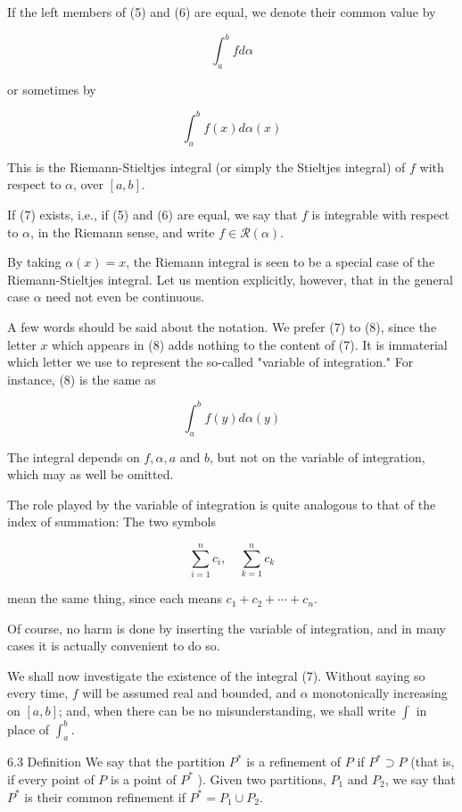 \documentclass[10pt]{article}
\begin{document}
If the left members of (5) and (6) are equal, we denote their common value by

$$
\int_{a}^{b} f d \alpha
$$

or sometimes by

$$
\int_{a}^{b} f(x) d \alpha(x)
$$

This is the Riemann-Stieltjes integral (or simply the Stieltjes integral) of $f$ with respect to $\alpha$, over $[a, b]$.

If (7) exists, i.e., if (5) and (6) are equal, we say that $f$ is integrable with respect to $\alpha$, in the Riemann sense, and write $f \in \mathscr{R}(\alpha)$.

By taking $\alpha(x)=x$, the Riemann integral is seen to be a special case of the Riemann-Stieltjes integral. Let us mention explicitly, however, that in the general case $\alpha$ need not even be continuous.

A few words should be said about the notation. We prefer (7) to (8), since the letter $x$ which appears in (8) adds nothing to the content of (7). It is immaterial which letter we use to represent the so-called "variable of integration." For instance, (8) is the same as

$$
\int_{a}^{b} f(y) d \alpha(y)
$$

The integral depends on $f, \alpha, a$ and $b$, but not on the variable of integration, which may as well be omitted.

The role played by the variable of integration is quite analogous to that of the index of summation: The two symbols

$$
\sum_{i=1}^{n} c_{i}, \quad \sum_{k=1}^{n} c_{k}
$$

mean the same thing, since each means $c_{1}+c_{2}+\cdots+c_{n}$.

Of course, no harm is done by inserting the variable of integration, and in many cases it is actually convenient to do so.

We shall now investigate the existence of the integral (7). Without saying so every time, $f$ will be assumed real and bounded, and $\alpha$ monotonically increasing on $[a, b]$; and, when there can be no misunderstanding, we shall write $\int$ in place of $\int_{a}^{b}$.

6.3 Definition We say that the partition $P^{*}$ is a refinement of $P$ if $P^{*} \supset P$ (that is, if every point of $P$ is a point of $P^{*}$ ). Given two partitions, $P_{1}$ and $P_{2}$, we say that $P^{*}$ is their common refinement if $P^{*}=P_{1} \cup P_{2}$.
\end{document}
